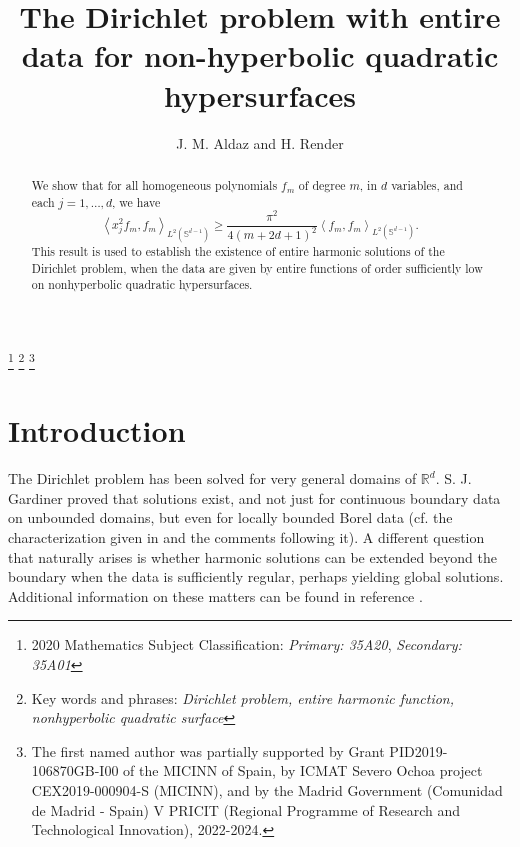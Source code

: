 \documentclass[12pt]{amsart}
\newcommand{\R}{\mathbb{R}}
\begin{document}
\title[]{The Dirichlet problem with entire data for non-hyperbolic quadratic hypersurfaces}
\author{J. M. Aldaz and H. Render}
\address{H. Render: School of Mathematical Sciences, University College
Dublin, Dublin 4, Ireland.}
\address{J.M. Aldaz: Instituto de Ciencias Matem\'aticas (CSIC-UAM-UC3M-UCM)
and Departamento de Matem\'aticas, Universidad Aut\'onoma de Madrid,
Cantoblanco 28049, Madrid, Spain.}
\thanks{2020 Mathematics Subject Classification: \emph{Primary: 35A20}, 
\emph{Secondary: 35A01}}
\thanks{Key words and phrases: \emph{Dirichlet problem, entire harmonic function, nonhyperbolic quadratic surface}}
\thanks{The first named author was partially supported by Grant PID2019-106870GB-I00 of the MICINN of Spain,  by ICMAT Severo Ochoa project
CEX2019-000904-S (MICINN), and by
the Madrid Government (Comunidad de Madrid - Spain)  V PRICIT (Regional Programme of Research and Technological Innovation), 2022-2024.}



\begin{abstract}
We show that for all homogeneous polynomials $
	f_{m}$ of degree $m$, in $d$ variables, 
	and each $j = 1, \dots , d$, we have
	\begin{equation*}
		\left\langle x_{j}^{2}f_{m},f_{m}\right\rangle _{L^{2}\left( \mathbb{S}%
			^{d-1}\right) }
			\geq
			\frac{\pi ^{2}}{4\left( m+ 2 d + 1 \right)^{2}}
			\left
			\langle
		f_{m},f_{m}\right\rangle _{L^{2}\left( \mathbb{S}^{d-1}\right) }.
		\end{equation*}
This result is used to establish the existence of entire harmonic solutions
of the Dirichlet problem,  when the data are given
by entire functions of order sufficiently low 
on nonhyperbolic quadratic hypersurfaces. 
\end{abstract}

\maketitle

\section{Introduction}

The Dirichlet problem has been solved for very general domains of $\R^d$. S. J. Gardiner proved that solutions exist, and
not just for continuous boundary data on unbounded domains, but  even for 
locally bounded Borel data (cf. the characterization given in  
 \cite[Theorem 1]{Gard93} and the comments following it). A different question that naturally arises
 is whether harmonic solutions can be extended beyond the boundary when the
 data is sufficiently regular, perhaps yielding global solutions. Additional information on these matters can be found in reference
 \cite{KL}.
 
\end{document}
